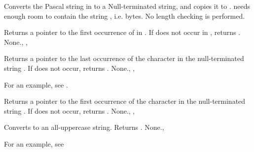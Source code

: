 {
Converts the Pascal string in  to a Null-terminated 
string, and copies it to .  needs enough room to contain
the string , i.e.  bytes.
}
{No length checking is performed.}{ }



{
Returns a pointer to the first occurrence of  in .
If  does not occur in , returns .
}
{None.}{, , }



{
Returns a pointer to the last occurrence of the character  in the
null-terminated string . If  does not occur, returns
.
}
{None.}{, , }

For an example, see .

{
Returns a pointer to the first occurrence of the character  in the
null-terminated string . If  does not occur, returns
.
}
{None.}{, , }



{
Converts  to an all-uppercase string. Returns .
}
{None.}{, }

For an example, see 
